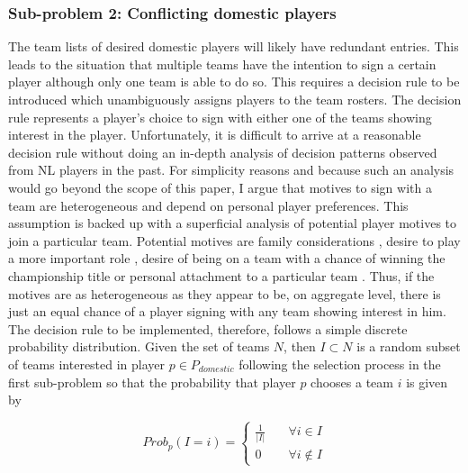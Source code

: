 \documentclass[12pt, a4paper]{article}
\begin{document}
\subsubsection{Sub-problem 2: Conflicting domestic players}
\label{subProblem2}

The team lists of desired domestic players will likely have redundant entries. This leads to the situation that multiple teams have the intention to sign a certain player although only one team is able to do so. This requires a decision rule to be introduced which unambiguously assigns players to the team rosters. The decision rule represents a player's choice to sign with either one of the teams showing interest in the player. Unfortunately, it is difficult to arrive at a reasonable decision rule without doing an in-depth analysis of decision patterns observed from NL players in the past. For simplicity reasons and because such an analysis would go beyond the scope of this paper, I argue that motives to sign with a team are heterogeneous and depend on personal player preferences. This assumption is backed up with a superficial analysis of potential player motives to join a particular team. Potential motives are family considerations \citep[see e.g.][]{rocchinotti_leonardo_2018}, desire to play a more important role \citep[see e.g.][]{vandenbrouck_so_2020}, desire of being on a team with a chance of winning the championship title \citep[see e.g.][]{roth_scb_2016} or personal attachment to a particular team \citep[see e.g.][]{noauthor_corvi_2018}. Thus, if the motives are as heterogeneous as they appear to be, on aggregate level, there is just an equal chance of a player signing with any team showing interest in him. The decision rule to be implemented, therefore, follows a simple discrete probability distribution. Given the set of teams $N$, then $I \subset N$ is a random subset of teams interested in player $p \in P_{domestic}$ following the selection process in the first sub-problem so that the probability that player $p$ chooses a team $i$ is given by

\begin{equation}
Prob_p(I=i) =
\begin{cases}
\frac{1}{|I|} & \quad  \forall i \in I \\
0 & \quad  \forall i \notin I 
\end{cases}
\end{equation}
\end{document}
